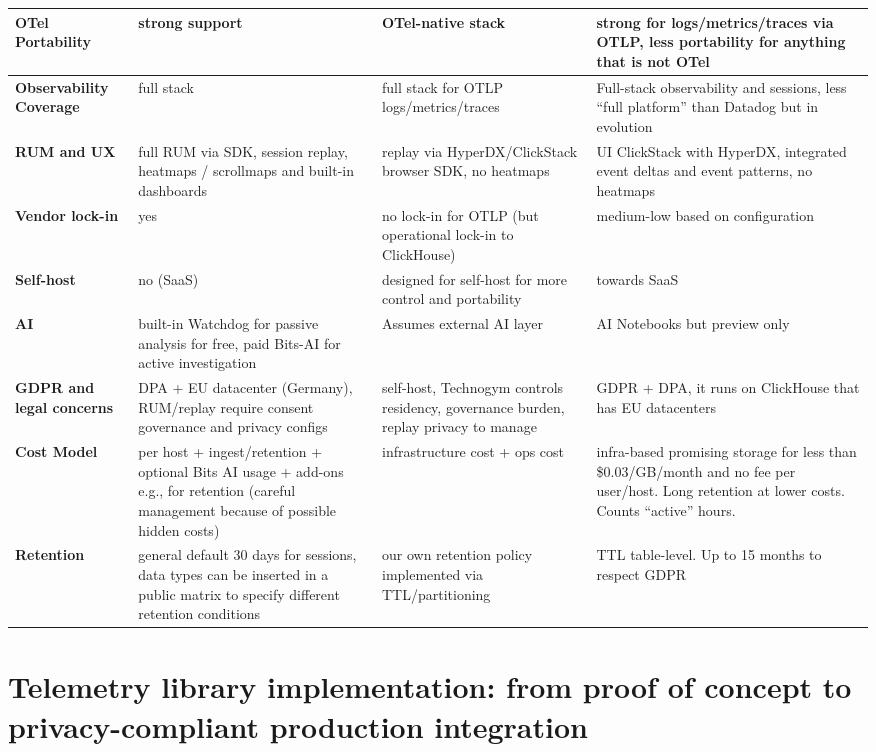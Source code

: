 \documentclass[12pt,a4paper,openright,twoside]{book}
\begin{document}
\begin{longtable}{|>{\centering\arraybackslash}p{3.5cm}|>{\centering\arraybackslash}p{3.5cm}|>{\centering\arraybackslash}p{3.5cm}|>{\centering\arraybackslash}p{3.5cm}|}
\textbf{OTel Portability} & strong support & OTel-native stack & strong for logs/metrics/traces via OTLP, less portability for anything that is not OTel \\
\hline
\textbf{Observability Coverage} & full stack & full stack for OTLP logs/metrics/traces & Full-stack observability and sessions, less “full platform” than Datadog but in evolution \\
\hline
\textbf{RUM and UX} & full RUM via SDK, session replay, heatmaps / scrollmaps and built-in dashboards & replay via HyperDX/ClickStack browser SDK, no heatmaps & UI ClickStack with HyperDX, integrated event deltas and event patterns, no heatmaps \\
\hline
\textbf{Vendor lock-in} & yes & no lock-in for OTLP (but operational lock-in to ClickHouse) & medium-low based on configuration \\
\hline
\textbf{Self-host} & no (SaaS) & designed for self-host for more control and portability & towards SaaS \\
\hline
\textbf{AI} & built-in Watchdog for passive analysis for free, paid Bits-AI for active investigation & Assumes external AI layer & AI Notebooks but preview only \\
\hline
\textbf{GDPR and legal concerns} & DPA + EU datacenter (Germany), RUM/replay require consent governance and privacy configs & self-host, Technogym controls residency, governance burden, replay privacy to manage & GDPR + DPA, it runs on ClickHouse that has EU datacenters \\
\hline
\textbf{Cost Model} & per host + ingest/retention + optional Bits AI usage + add-ons e.g., for retention (careful management because of possible hidden costs) & infrastructure cost + ops cost & infra-based promising storage for less than \$0.03/GB/month and no fee per user/host. Long retention at lower costs. Counts ``active'' hours.\\
\hline
\textbf{Retention} & general default 30 days for sessions, data types can be inserted in a public matrix to specify different retention conditions & our own retention policy implemented via TTL/partitioning & TTL table-level. Up to 15 months to respect GDPR \\
\end{longtable}

\chapter{Telemetry library implementation: from proof of concept to privacy-compliant production integration}
\end{document}
